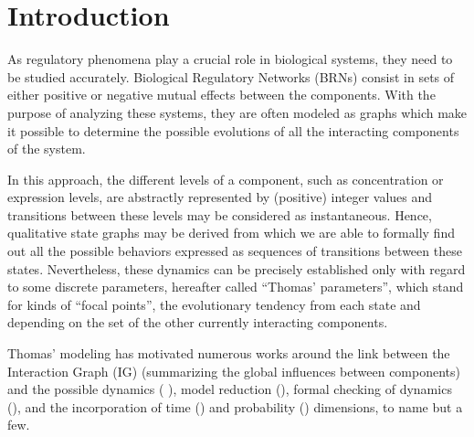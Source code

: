 \section{Introduction}\label{sec:intro}

As regulatory phenomena play a crucial role in biological systems, they need to be studied accurately.
Biological Regulatory Networks (BRNs) consist in sets of either positive or negative mutual effects between the components.
With the purpose of analyzing these systems, they are often modeled as graphs which make it possible to determine the possible evolutions of all the interacting components of the system.

In this approach, the different levels of a component, such as concentration or expression levels, are abstractly represented by (positive) integer values and transitions between these levels may be considered as instantaneous.
Hence, qualitative state graphs may be derived from which we are able to formally find out all the possible behaviors expressed as sequences of transitions between these states.
Nevertheless, these dynamics can be precisely established only with regard to some discrete parameters,
hereafter called ``Thomas' parameters'',
which stand for kinds of ``focal points'', \ie the evolutionary tendency from each state and depending on the set of the other currently interacting components.

Thomas' modeling has motivated numerous works around the link between the Interaction Graph (IG)
(summarizing the global influences between components) and the possible dynamics (\eg
\cite{RiCo07,RRT08}),
model reduction (\eg \cite{Naldi09}), formal checking of dynamics (\eg \cite{Richard06,Naldi07}), 
and the incorporation of time (\eg \cite{Siebert06,Ahmad08}) and probability
(\eg \cite{Twardziok10-CMSB}) dimensions, to name but a few.

